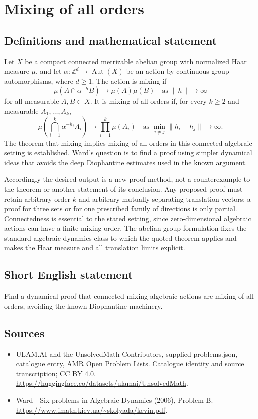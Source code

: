 \documentclass[11pt,a4paper]{article}
\begin{document}
\section*{Mixing of all orders}\label{statement}

\subsection{Definitions and mathematical statement}
Let $X$ be a compact connected metrizable abelian group with normalized
Haar measure $\mu$, and let $\alpha:\mathbb Z^d\to\operatorname{Aut}(X)$
be an action by continuous group automorphisms, where $d\ge1$.
The action is mixing if
\[
 \mu(A\cap\alpha^{-h}B)\longrightarrow\mu(A)\mu(B)
             \quad\text{as }\|h\|\to\infty
\]
for all measurable $A,B\subset X$. It is mixing of all orders if, for
every $k\ge2$ and measurable $A_1,\ldots,A_k$,
\[
 \mu\!\left(\bigcap_{i=1}^k\alpha^{-h_i}A_i\right)
       \longrightarrow\prod_{i=1}^k\mu(A_i)
 \quad\text{as }\min_{i\ne j}\|h_i-h_j\|\to\infty.
\]
The theorem that mixing implies mixing of all orders in this connected
algebraic setting is established. Ward's question is to find a proof
using simpler dynamical ideas that avoids the deep Diophantine estimates
used in the known argument.

Accordingly the desired output is a new proof method, not a counterexample
to the theorem or another statement of its conclusion. Any proposed proof
must retain arbitrary order $k$ and arbitrary mutually separating
translation vectors; a proof for three sets or for one prescribed family
of directions is only partial. Connectedness is essential to the stated
setting, since zero-dimensional algebraic actions can have a finite mixing
order. The abelian-group formulation fixes the standard algebraic-dynamics
class to which the quoted theorem applies and makes the Haar measure and
all translation limits explicit.
\subsection{Short English statement}
Find a dynamical proof that connected mixing algebraic actions are mixing of all orders, avoiding the known Diophantine machinery.
\subsection{Sources}
\begin{itemize}
\item[S1] ULAM.AI and the UnsolvedMath Contributors, supplied problems.json, catalogue entry, AMR Open Problem Lists. Catalogue identity and source transcription; CC BY 4.0.
\url{https://huggingface.co/datasets/ulamai/UnsolvedMath}.
\item[S2] Ward - Six problems in Algebraic Dynamics (2006), Problem B. 
\url{https://www.imath.kiev.ua/~skolyada/kevin.pdf}.
\end{itemize}
\end{document}
